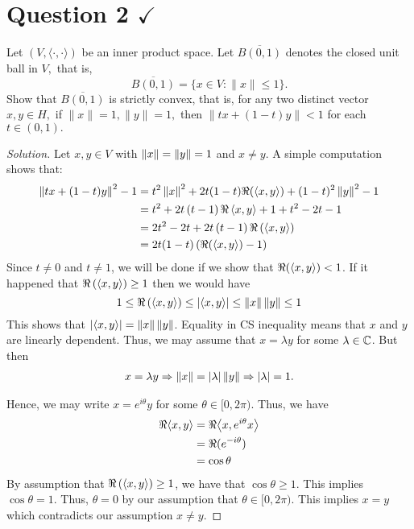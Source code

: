 \section{Question 2 \texorpdfstring{$\checkmark$}{}}

\horz

Let $(V,\langle \cdot, \cdot \rangle)$ be an inner product space. Let $\overline{B(0,1)}$ denotes the closed unit ball in $V,$ that is, $$\overline{B(0,1)} = \{x\in V : \|x\|\leqslant 1\}.$$
Show that $\overline{B(0,1)}$ is strictly convex, that is, for any two distinct vector $x,y\in H,$ if $\|x\|=1, \|y\|=1,$ then $\|tx+(1-t)y\| < 1$ for each $t\in (0,1).$
 
\horz

\begin{proof}[Solution]
    Let $x,y \in V$ with $\left\lVert x \right\rVert=\left\lVert y \right\rVert=1$ and $x\ne y$. A simple computation shows that: 
    \begin{align*}
	\left\lVert tx+(1-t)y \right\rVert^{2} -1 &= t^{2} \left\lVert x \right\rVert^{2} + 2t(1-t)\Re(\left\langle x,y \right\rangle) + (1-t)^{2} \left\lVert y \right\rVert^{2}  -1 \\
	&= t^{2} +2t\left( t-1 \right) \Re\left\langle x,y \right\rangle + 1+t^{2}-2t -1 \\
	&= 2t^{2} -2t + 2t\left( t-1 \right) \Re\left( \left\langle x,y \right\rangle \right) \\
	    &= 2t(1-t) \left( \Re (\left\langle x,y \right\rangle) -1 \right)
	\end{align*}
	Since $t\ne 0$ and $t\ne 1$, we will be done if we show that $\Re (\left\langle x,y \right\rangle) < 1$. If it happened that $\Re \left( \left\langle x,y \right\rangle \right) \ge 1$ then we would have
	\begin{equation*}
	    1 \le \Re  \left( \left\langle x,y \right\rangle \right) \le \left\lvert \left\langle x,y \right\rangle \right\rvert \le \left\lVert x \right\rVert \left\lVert y \right\rVert \le 1
	\end{equation*}
	This shows that $\left\lvert \left\langle x,y \right\rangle \right\rvert = \left\lVert x \right\rVert\left\lVert y \right\rVert$. Equality in CS inequality means that $x$ and $y$ are linearly dependent. Thus, we may assume that $x=\lambda y$ for some $\lambda \in \mathbb C$. But then
	\begin{align*}
	    x= \lambda y \Rightarrow \left\lVert x \right\rVert = \left\lvert \lambda \right\rvert\left\lVert y \right\rVert \Rightarrow \left\lvert \lambda \right\rvert=1\text{.}
	\end{align*}

	Hence, we may write $x=e^{i\theta} y$ for some $\theta \in [0,2\pi)$. Thus, we have
	\begin{align*}
	    \Re{\left\langle x,y \right\rangle} &= \Re {\left\langle x, e^{i\theta} x \right\rangle} \\
	    &= \Re{(e^{-i\theta})} \\
	    &= \cos \theta 
	\end{align*}
	By assumption that $\Re \left( \left\langle x,y \right\rangle \right) \ge 1$, we have that $\cos \theta \ge 1$. This implies $\cos \theta = 1$. Thus, $\theta = 0$ by our assumption that $\theta \in [0, 2\pi)$. This implies $x=y$ which contradicts our assumption $x\ne y$.
\end{proof}
